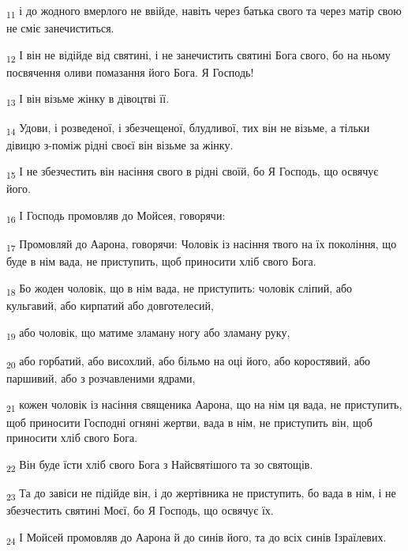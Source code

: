 \begin{tcolorbox}
\textsubscript{11} і до жодного вмерлого не ввійде, навіть через батька свого та через матір свою не сміє занечиститься.
\end{tcolorbox}
\begin{tcolorbox}
\textsubscript{12} І він не відійде від святині, і не занечистить святині Бога свого, бо на ньому посвячення оливи помазання його Бога. Я Господь!
\end{tcolorbox}
\begin{tcolorbox}
\textsubscript{13} І він візьме жінку в дівоцтві її.
\end{tcolorbox}
\begin{tcolorbox}
\textsubscript{14} Удови, і розведеної, і збезчещеної, блудливої, тих він не візьме, а тільки дівицю з-поміж рідні своєї він візьме за жінку.
\end{tcolorbox}
\begin{tcolorbox}
\textsubscript{15} І не збезчестить він насіння свого в рідні своїй, бо Я Господь, що освячує його.
\end{tcolorbox}
\begin{tcolorbox}
\textsubscript{16} І Господь промовляв до Мойсея, говорячи:
\end{tcolorbox}
\begin{tcolorbox}
\textsubscript{17} Промовляй до Аарона, говорячи: Чоловік із насіння твого на їх покоління, що буде в нім вада, не приступить, щоб приносити хліб свого Бога.
\end{tcolorbox}
\begin{tcolorbox}
\textsubscript{18} Бо жоден чоловік, що в нім вада, не приступить: чоловік сліпий, або кульгавий, або кирпатий або довготелесий,
\end{tcolorbox}
\begin{tcolorbox}
\textsubscript{19} або чоловік, що матиме зламану ногу або зламану руку,
\end{tcolorbox}
\begin{tcolorbox}
\textsubscript{20} або горбатий, або висохлий, або більмо на оці його, або коростявий, або паршивий, або з розчавленими ядрами,
\end{tcolorbox}
\begin{tcolorbox}
\textsubscript{21} кожен чоловік із насіння священика Аарона, що на нім ця вада, не приступить, щоб приносити Господні огняні жертви, вада в нім, не приступить він, щоб приносити хліб свого Бога.
\end{tcolorbox}
\begin{tcolorbox}
\textsubscript{22} Він буде їсти хліб свого Бога з Найсвятішого та зо святощів.
\end{tcolorbox}
\begin{tcolorbox}
\textsubscript{23} Та до завіси не підійде він, і до жертівника не приступить, бо вада в нім, і не збезчестить святині Моєї, бо Я Господь, що освячує їх.
\end{tcolorbox}
\begin{tcolorbox}
\textsubscript{24} І Мойсей промовляв до Аарона й до синів його, та до всіх синів Ізраїлевих.
\end{tcolorbox}

